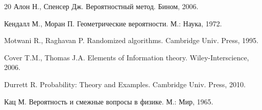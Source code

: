 \begin{thebibliography} {20}
Алон Н., Спенсер Дж. Вероятностный метод. Бином, 2006.

Кендалл М., Моран П. Геометрические вероятности. М.: Наука, 1972.

Motwani R., Raghavan P. Randomized algorithms. Cambridge Univ. Press, 1995.

Cover T.M., Thomas J.A. Elements of Information theory. Wiley-Interscience, 2006. 

Durrett R. Probability: Theory and Examples. Cambridge Univ. Press, 2010.

Кац М. Вероятность и смежные вопросы в физике. М.: Мир, 1965.


\end{thebibliography}


